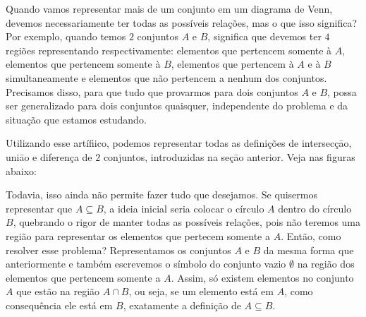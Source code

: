 
  Quando vamos representar mais de um conjunto em um diagrama de Venn, devemos necessariamente ter todas as possíveis relações, mas o que isso significa? Por exemplo, quando temos $2$ conjuntos $A$ e $B$, significa que devemos ter $4$ regiões representando respectivamente: elementos que pertencem somente à $A$, elementos que pertencem somente à $B$, elementos que pertencem à $A$ e à $B$ simultaneamente e elementos que não pertencem a nenhum dos conjuntos. Precisamos disso, para que tudo que provarmos para dois conjuntos $A$ e $B$, possa ser generalizado para dois conjuntos quaisquer, independente do problema e da situação que estamos estudando.

  Utilizando esse artífiico, podemos representar todas as definições de intersecçāo, uniāo e diferença de $2$ conjuntos, introduzidas na seçāo anterior. Veja nas figuras abaixo:




  Todavia, isso ainda não permite fazer tudo que desejamos. Se quisermos representar que $A \subseteq B$, a ideia inicial seria colocar o círculo $A$ dentro do círculo $B$, quebrando o rigor de manter todas as possíveis relações, pois não teremos uma região para representar os elementos que pertecem somente a $A$. Então, como resolver esse problema? Representamos os conjuntos $A$ e $B$ da mesma forma que anteriormente e também escrevemos o símbolo do conjunto vazio $\emptyset$ na região dos elementos que pertencem somente a $A$. Assim, só existem elementos no conjunto $A$ que estão na região $A\cap B$, ou seja, se um elemento está em $A$, como consequência ele está em $B$, exatamente a definição de $A \subseteq B$.

